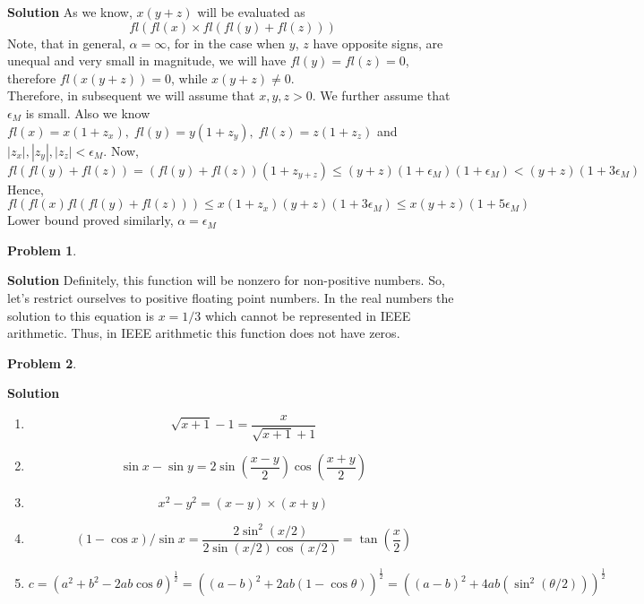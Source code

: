 \documentclass[8pt]{article} %
\newtheorem{prob}{Problem}
\newenvironment{solution}%
{\par\textbf{Solution}\space }%
{\par}
\begin{document}
\begin{solution}
	As we know, $x(y+z)$ will be evaluated as
	\[fl(fl(x)\times fl(fl(y)+fl(z)))\]
	Note, that in general, $\alpha=\infty$, for in the case when $y$, $z$ have opposite signs, are unequal and very small in magnitude,
	we will have $fl(y)=fl(z)=0$, therefore $fl(x(y+z))=0$, while $x(y+z)\neq 0$.\\ Therefore, in subsequent we will assume that $x,y,z>0$.
	We further assume that $\epsilon_M$ is small.
	Also we know $fl(x)=x(1+z_x),\;fl(y)=y(1+z_y),\;fl(z)=z(1+z_z)$ and $|z_x|,|z_y|,|z_z|<\epsilon_M$. Now,
	\[fl(fl(y)+fl(z))=(fl(y)+fl(z))(1+z_{y+z})\leq (y+z)(1+\epsilon_M)(1+\epsilon_M)<(y+z)(1+3\epsilon_M)\]
	Hence,
	\[fl(fl(x)fl(fl(y)+fl(z))) \leq x(1+z_x)(y+z)(1+3\epsilon_M)\leq x(y+z)(1+5\epsilon_M)\]
	Lower bound proved similarly, $\alpha=\epsilon_M$
\end{solution}
\begin{prob}
\end{prob}
\begin{solution}
	Definitely, this function will be nonzero for non-positive numbers. So, let's restrict ourselves to positive floating point numbers.
	In the real numbers the solution to this equation is $x=1/3$ which cannot be represented in IEEE arithmetic. Thus, in IEEE arithmetic
	this function does not have zeros.
\end{solution}
\begin{prob}
\end{prob}
\begin{solution}
	\begin{enumerate}[label=(\alph*)]
		\item{\[\sqrt{x+1}-1=\frac{x}{\sqrt{x+1}+1}\]}
		\item{\[\sin x-\sin y=2 \sin(\frac{x-y}{2})\cos(\frac{x+y}{2})\]}
		\item{\[x^2-y^2=(x-y)\times(x+y)\]}
		\item{\[(1-\cos x)/\sin x=\frac{2\sin^2 (x/2)}{2\sin (x/2)\cos (x/2)}=\tan (\frac{x}{2})\]}
		\item{\[c=(a^2+b^2-2ab\cos \theta)^{\frac{1}{2}}=((a-b)^2+2ab(1-\cos \theta))^{\frac{1}{2}}=
			((a-b)^2+4ab(\sin^2(\theta/2)))^{\frac{1}{2}}\]}
	\end{enumerate}
\end{solution}
\end{document}
